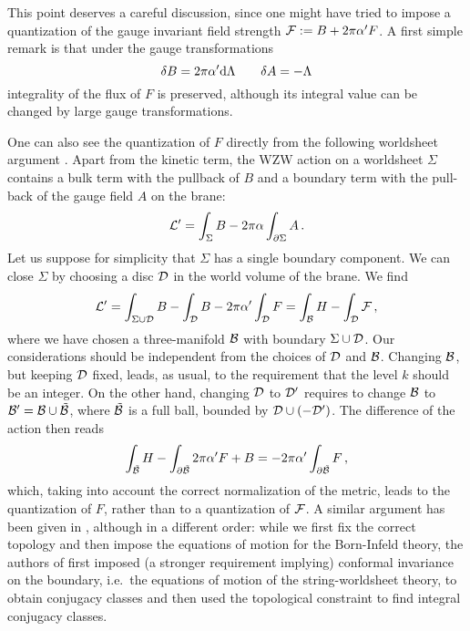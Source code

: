 \documentclass[a4paper,12pt]{article} \usepackage{amssymb,amsfonts,latexsym}
\begin{document}
This point deserves a careful discussion, since one might have tried
to impose a quantization of the gauge invariant field strength
${\cal F} := B + 2\pi\alpha' F$. A first simple remark is that under the
gauge transformations
$$ \delta B = 2\pi\alpha'{\rm d}\Lambda \qquad \delta A = -\Lambda $$
integrality of the flux of $F$ is preserved, although its integral value
can be changed by large gauge transformations. 

One can also see the quantization of $F$ directly from the following 
worldsheet argument \cite{pelc}. Apart from the kinetic term, the WZW action 
on a worldsheet $\Sigma$ contains a bulk term with the pullback of $B$
and a boundary term with the pull-back of the gauge field $A$ on the brane:
\begin{equation}
{\cal L}' = \int_\Sigma B - 2\pi \alpha \int_{\partial\Sigma} A \, . 
\label{action} \end{equation}
Let us suppose for simplicity that $\Sigma$ has a single boundary component.
We can close $\Sigma$ by choosing a disc ${\cal D}$ in the world volume of
the brane. We find
$$ 
{\cal L}' = \int_{\Sigma\cup {\cal D}} B - \int_{{\cal D}} B - 2\pi\alpha' 
\int_{\cal D} F 
= \int_{{\cal B}} H - \int_{\cal D} {\cal F}  \, , $$
where we have chosen a three-manifold ${\cal B}$ with boundary $\Sigma\cup {\cal D}$.
Our considerations should be independent from the choices of ${\cal D}$ and
${\cal B}$. Changing ${\cal B}$, but keeping ${\cal D}$ fixed, leads, as usual, to
the requirement that the level $k$ should be an integer. On the other hand,
changing ${\cal D}$ to ${\cal D}'$ requires to change ${\cal B}$ to ${\cal B}' =
{\cal B}\cup\tilde{{\cal B}}$, where $\tilde{{\cal B}}$ is a full ball, bounded by
${\cal D}\cup(-{\cal D}')$. The difference of the action  then reads
$$ 
\int_{\tilde{{\cal B}}} H - \int_{\partial\tilde{{\cal B}}} 2\pi\alpha' F + B 
= - 2\pi\alpha' \int_{\partial\tilde{{\cal B}}} F \,, $$
which, taking into account the correct normalization of the metric, leads
to the quantization of $F$, rather than to a quantization of ${\cal F}$. 
A similar argument has been given in \cite{alsc2}, although in a 
different order: while we first fix the correct topology and then impose
the equations of motion for the Born-Infeld theory, the authors of \cite{alsc2}
first imposed (a stronger requirement implying) conformal invariance 
on the boundary, i.e.\ the equations of motion of the string-worldsheet 
theory, to obtain conjugacy classes and then used the topological constraint to 
find integral conjugacy classes.
\end{document}
